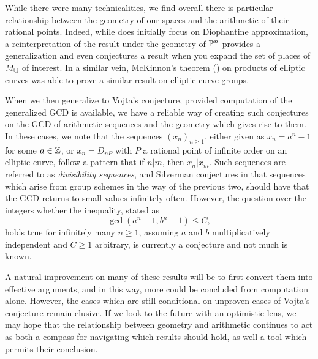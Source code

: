 While there were many technicalities,
we find overall there is particular relationship between the geometry of our spaces and the arithmetic of their rational points.
Indeed, while \cite{BCZ_2002} does initially focus on  Diophantine approximation,
a reinterpretation of the result under the geometry of $\mathbb{P}^n$ provides a generalization and even conjectures a result when you expand the set of places of $M_{\mathbb{Q}}$ of interest.
In a similar vein, McKinnon's theorem (\cite{McKinnon_2003}) on products of elliptic curves was able to prove a similar result on elliptic curve groups.

When we then generalize to Vojta's conjecture,
provided computation of the generalized GCD is available,
we have a reliable way of creating such conjectures on the GCD of arithmetic sequences and the geometry which gives rise to them.
In these cases, we note that the sequences $(x_n)_{n \geq 1}$,
either given as $x_n = a^n - 1$ for some $a \in \mathbb{Z}$,
or $x_n = D_{nP}$ with $P$ a rational point of infinite order on an elliptic curve,
follow a pattern that if $n | m$, then $x_n | x_m$.
Such sequences are referred to as \textit{divisibility sequences},
and Silverman conjectures in \cite{Silverman_2004} that sequences which arise from group schemes in the way of the previous two,
should have that the GCD returns to small values infinitely often.
However, the question over the integers whether the inequality, stated as
\[
    \gcd(a^n - 1, b^n - 1) \leq C,
\]
holds true for infinitely many $n \geq 1$,
assuming $a$ and $b$ multiplicatively independent and $C \geq 1$ arbitrary,
is currently a conjecture and not much is known.

A natural improvement on many of these results will be to first convert them into effective arguments,
and in this way,
more could be concluded from computation alone.
However, the cases which are still conditional on unproven cases of Vojta's conjecture remain elusive.
If we look to the future with an optimistic lens,
we may hope that the relationship between geometry and arithmetic continues to act as both a compass for navigating which results should hold,
as well a tool which permits their conclusion.